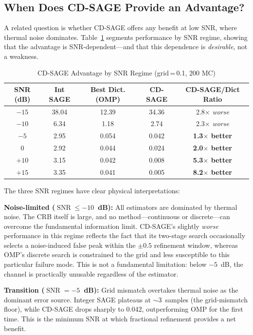 \documentclass[journal]{IEEEtran}
\DeclareMathOperator{\SNR}{SNR}
\begin{document}
\subsection{When Does CD-SAGE Provide an Advantage?}

A related question is whether CD-SAGE offers any benefit at low SNR, where thermal noise dominates. Table~\ref{tab:snr_regime} segments performance by SNR regime, showing that the advantage is SNR-dependent---and that this dependence is \textit{desirable}, not a weakness.

\begin{table}[t]
\centering
\caption{CD-SAGE Advantage by SNR Regime (grid$\,$=$\,$0.1, 200 MC)}
\label{tab:snr_regime}
\small
\begin{tabular}{@{}ccccc@{}}
\toprule
SNR (dB) & Int SAGE & Best Dict. (OMP) & CD-SAGE & CD-SAGE/Dict Ratio \\
\midrule
$-15$ & 38.04 & 12.39 & 34.36 & 2.8$\times$ \textit{worse} \\
$-10$ &  6.34 &  1.18 &  2.74 & 2.3$\times$ \textit{worse} \\
$ -5$ &  2.95 &  0.054 & 0.042 & \textbf{1.3$\times$ better} \\
$  0$ &  2.92 &  0.044 & 0.024 & \textbf{2.0$\times$ better} \\
$+10$ &  3.15 &  0.042 & 0.008 & \textbf{5.3$\times$ better} \\
$+15$ &  3.35 &  0.041 & 0.005 & \textbf{8.2$\times$ better} \\
\bottomrule
\end{tabular}
\end{table}

The three SNR regimes have clear physical interpretations:

\textbf{Noise-limited ($\SNR \le -10$~dB):} All estimators are dominated by thermal noise. The CRB itself is large, and no method---continuous or discrete---can overcome the fundamental information limit. CD-SAGE's slightly \textit{worse} performance in this regime reflects the fact that its two-stage search occasionally selects a noise-induced false peak within the $\pm 0.5$ refinement window, whereas OMP's discrete search is constrained to the grid and less susceptible to this particular failure mode. This is not a fundamental limitation: below $-5$~dB, the channel is practically unusable regardless of the estimator.

\textbf{Transition ($\SNR = -5$~dB):} Grid mismatch overtakes thermal noise as the dominant error source. Integer SAGE plateaus at $\sim$3~samples (the grid-mismatch floor), while CD-SAGE drops sharply to 0.042, outperforming OMP for the first time. This is the minimum SNR at which fractional refinement provides a net benefit.
\end{document}
